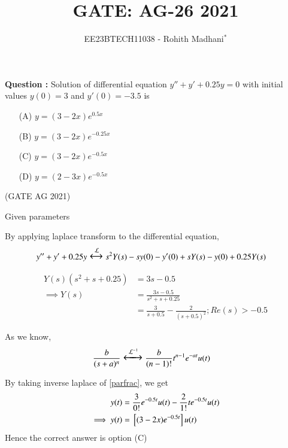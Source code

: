 \documentclass[journal,12pt,twocolumn]{IEEEtran}
\theoremstyle{remark}
\begin{document}

\vspace{3cm}

\title{GATE: AG-26 2021}
\author{EE23BTECH11038 - Rohith Madhani$^{*}$%
}
\maketitle
\newpage
\bigskip
\renewcommand{\thefigure}{\theenumi}
\renewcommand{\thetable}{\theenumi}

\textbf{Question :} Solution of differential equation $y'' + y'+ 0.25y = 0$ with initial values $y(0) = 3$ and $y'(0) = -3.5$ is
\begin{enumerate}
    \item[(A)] $ y = (3-2x)e^{0.5x} $
    \item[(B)] $ y = (3-2x)e^{-0.25x}$
    \item[(C)] $ y = (3-2x)e^{-0.5x}$
    \item[(D)] $ y = (2-3x)e^{-0.5x}$
\end{enumerate} 
\hfill(GATE AG 2021) \\
\solution

\begin{table}[!h] 
    \centering
    
    \caption{Given parameters}
    \label{table:gate21ag26}
\end{table}
By applying laplace transform to the differential equation,
\begin{align}
    y''+y'+0.25y &\Large\xleftrightarrow{\mathcal{L}} s^2Y(s)-sy(0)-y'(0)+sY(s)-y(0)+0.25Y(s)
\end{align}

\begin{align}
    Y(s)(s^2 + s + 0.25) &= 3s - 0.5 \\
    \implies Y(s) &= \frac{3s-0.5}{s^2 + s + 0.25} \\
    &= \frac{3}{s+0.5} - \frac{2}{(s+0.5)^2};Re(s) > -0.5 \label{parfrac}
\end{align}

As we know,
\begin{align}
    \frac{b}{(s+a)^n} &\Large\xleftrightarrow{\mathcal{L}^{-1}}\frac{b}{(n-1)!} t^{n-1} e^{-at} u(t)
\end{align}

By taking inverse laplace of \eqref{parfrac}, we get
\begin{align}
    y(t) &= \frac{3}{0!}e^{-0.5t}u(t)-\frac{2}{1!}te^{-0.5t}u(t) \\
    \implies y(t) &= {}\left[(3-2x)e^{-0.5t}\right]u(t)
\end{align}
Hence the correct answer is option (C)
\newpage
\end{document}
